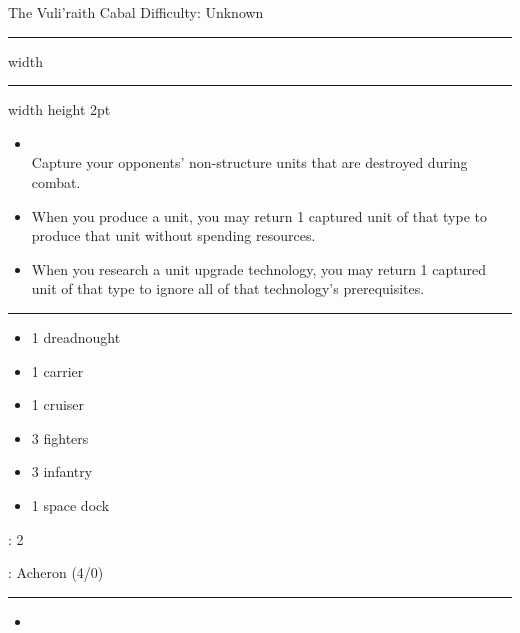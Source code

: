 {\handel\Huge The Vuli'raith Cabal} \hfill {\Large Difficulty: Unknown} \vspace{-4pt}\\
\hrule width \hsize \kern 1mm \hrule width \hsize height 2pt


\begin{multicols}{2}


\begin{itemize}
\item {}\\
Capture your opponents' non-structure units that are destroyed during combat.
\item {} When you produce a unit, you may return 1 captured unit of that type to produce that unit without spending resources.
\item {} When you research a unit upgrade technology, you may return 1 captured unit of that type to ignore all of that technology's prerequisites.
\end{itemize}


\vspace{-10pt}\rule{\hsize}{0.4pt}\vspace{5pt}


\vspace{-5pt}
\begin{multicols}{2}
\begin{itemize}
\item 1 dreadnought
\item 1 carrier
\item 1 cruiser
\item 3 fighters
\item 3 infantry
\item 1 space dock
\end{itemize}
\end{multicols}

\vspace{-5pt}
: 2

\vspace{2pt}
: Acheron (4/0)

\rule{\hsize}{0.4pt}\vspace{5pt}


\begin{itemize}
\item \assembly
\end{itemize}


\end{multicols}
